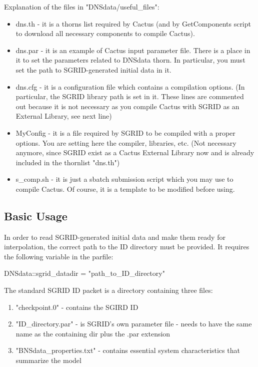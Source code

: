 Explanation of the files in "DNSdata/useful\_files":

\begin{itemize}
\item dns.th - it is a thorns list required by Cactus (and by GetComponents script to download all necessary components to compile Cactus).
\item dns.par - it is an example of Cactus input parameter file. There is a place in it to set the parameters related to DNSdata thorn. In particular, you must set the path to SGRID-generated initial data in it.
\item dns.cfg - it is a configuration file which contains a compilation options. (In particular, the SGRID library path is set in it. These lines are commented out because it is not necessary as you compile Cactus with SGRID as an External Library, see next line)
\item MyConfig  - it is a file required by SGRID to be compiled with a proper options. You are setting here the compiler, libraries, etc. (Not necessary anymore, since SGRID exist as a Cactus External Library now and is already included in the thornlist "dns.th")
\item s\_comp.sh - it is just a sbatch submission script which you may use to compile Cactus. Of course, it is a template to be modified before using.
\end{itemize}

\subsection{Basic Usage}

In order to read SGRID-generated initial data and make them ready for
interpolation, the correct path to the ID directory must be provided. It
requires the following variable in the parfile:

DNSdata::sgrid\_datadir = "path\_to\_ID\_directory"

The standard SGRID ID packet is a directory containing three files:
\begin{enumerate}
\item "checkpoint.0" - contains the SGIRD ID
\item "ID\_directory.par" - is SGRID's own parameter file - needs to have the same name as the containing dir plus the .par extension
\item "BNSdata\_properties.txt" - contains essential system characteristics that summarize the model
\end{enumerate}

